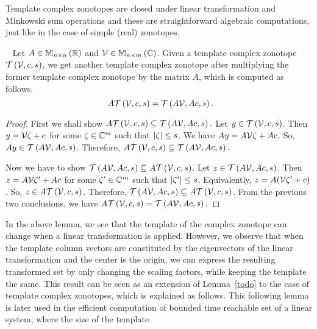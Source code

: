 Template complex zonotopes are closed under linear transformation and
Minkowski sum operations and these are straightforward algebraic
computations, just like in the case of simple (real) zonotopes.
%
\begin{lemma}~\label{lem:lin-transform}
Let $A\in\mathbb{M}_{n\times n}\left(\mathbb{R}\right)$ and $\mathcal{V}\in\mathbb{M}_{n\times m}\left(\mathbb{C}\right)$.
Given a template complex zonotope $\mathit{\operatorname{\mathcal{T}}}\left(\mathcal{V},c,s\right)$, we
get another template complex zonotope after multiplying the former
template complex zonotope by the matrix $A$, which is computed as
follows. 
%
\begin{equation}[Linear transformation]~\label{eqn:lin-transform}
A\tcztope{\ptemp}{\cen}{\sfact}=\tcztope{A\ptemp}{A\cen}{\sfact}.
\end{equation}
%
\end{lemma}
%
\begin{proof}
First we shall show
$A\mathit{\operatorname{\mathcal{T}}}\left(\mathcal{V},c,s\right)\subseteq\mathit{\operatorname{\mathcal{T}}}\left(A\mathcal{V},Ac,s\right).$
Let $y\in\mathit{\operatorname{\mathcal{T}}}\left(\mathcal{V},c,s\right)$.  Then $y=\mathcal{V}\zeta+c$
for some $\zeta\in\mathbb{C}^m$ such that
$\left|\zeta\right|\leq s$.  We have $Ay=A\mathcal{V}\zeta+Ac$.  So,
$Ay\in\mathit{\operatorname{\mathcal{T}}}\left(A\mathcal{V},Ac,s\right)$.  Therefore,
$A\mathit{\operatorname{\mathcal{T}}}\left(\mathcal{V},c,s\right)\subseteq\mathit{\operatorname{\mathcal{T}}}\left(A\mathcal{V},Ac,s\right).$
 
Now we have to show $\mathit{\operatorname{\mathcal{T}}}\left(A\mathcal{V},Ac,s\right)\subseteq
A\mathit{\operatorname{\mathcal{T}}}\left(\mathcal{V},c,s\right)$.  Let
$z\in\mathit{\operatorname{\mathcal{T}}}\left(A\mathcal{V},Ac,s\right)$.  Then $z=A\mathcal{V}\zeta^\prime+Ac$
for some $\zeta^\prime\in\mathbb{C}^m$ such that
$\left|\zeta^\prime\right|\leq s$.  Equivalently, $z=
A(\mathcal{V}\zeta^\prime+c)$.  So, $z\in
A\mathit{\operatorname{\mathcal{T}}}\left(\mathcal{V},c,s\right)$.  Therefore, $\mathit{\operatorname{\mathcal{T}}}\left(A\mathcal{V},Ac,s\right)\subseteq
A\mathit{\operatorname{\mathcal{T}}}\left(\mathcal{V},c,s\right)$.
From the previous two conclusions, we have
$A\mathit{\operatorname{\mathcal{T}}}\left(\mathcal{V},c,s\right)=\mathit{\operatorname{\mathcal{T}}}\left(A\mathcal{V},Ac,s\right).$
\end{proof}
%
In the above lemma, we see that the template of the complex zonotope
can change when a linear transformation is applied.  However, we
observe that when the template column vectors are constituted by the
eigenvectors of the linear transformation and the center is the
origin, we can express the resulting transformed set by only changing
the scaling factors, while keeping the template the same.  This result
can be seen as an extension of Lemma~\ref{todo} to the case of
template complex zonotopes, which is explained as follows.  This
following lemma is later used in the efficient computation of bounded
time reachable set of a linear system, where the size of the template
